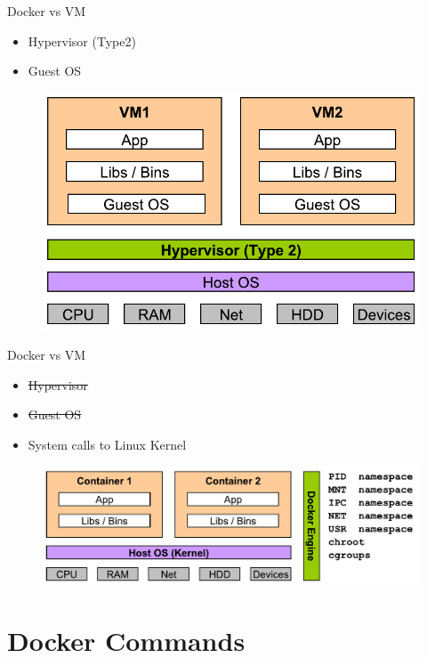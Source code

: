 \begin{frame}{Docker vs VM}
  \begin{itemize}
    \item Hypervisor (Type2)
    \item Guest OS    
  \end{itemize}
  \begin{figure}
    \includegraphics[scale=0.5]{figures/vm-hypervisor.pdf}
  \end{figure}
\end{frame}

\begin{frame}{Docker vs VM}
  \begin{itemize}
    \item \sout{Hypervisor}
    \item \sout{Guest OS}
    \item {\btHL System calls to Linux Kernel}
  \end{itemize}
  \begin{figure}
    \includegraphics[scale=0.5]{figures/vm-docker.pdf}
  \end{figure}
\end{frame}

\section{Docker Commands}

